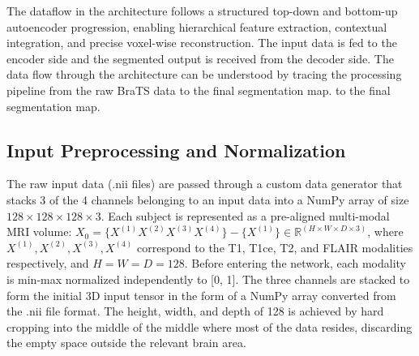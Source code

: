 \documentclass[a4paper,fleqn]{cas-dc}
\begin{document}
The dataflow in the architecture follows a structured top-down and bottom-up autoencoder progression, enabling hierarchical feature extraction, contextual integration, and precise voxel-wise reconstruction. The input data is fed to the encoder side and the segmented output is received from the decoder side.
The data flow through the architecture can be understood by tracing the processing pipeline from the raw BraTS data to the final segmentation map. to the final segmentation map.

\subsection{Input Preprocessing and Normalization}

The raw input data (.nii files) are passed through a custom data generator that stacks 3 of the 4 channels belonging to an input data into a NumPy array of size $128 \times 128 \times 128 \times 3$.
Each subject is represented as a pre-aligned multi-modal MRI volume:
$X_0 = \{X^{(1)} X^{(2)} X^{(3)} X^{(4)}\} - \{X^{(1)}\}\in \mathbb{R}^{(H\times W\times D\times 3)}$, where $X^{(1)}, X^{(2)}, X^{(3)}, X^{(4)}$ correspond to the T1, T1ce, T2, and FLAIR modalities respectively, and $H = W = D = 128$. Before entering the network, each modality is min-max normalized independently to [0, 1]. The three channels are stacked to form the initial 3D input tensor in the form of a NumPy array converted from the .nii file format. The height, width, and depth of 128 is achieved by hard cropping into the middle of the middle where most of the data resides, discarding the empty space outside the relevant brain area.
\end{document}

